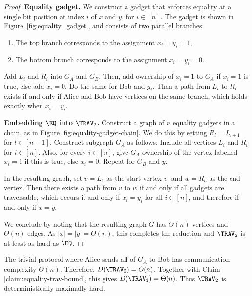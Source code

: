 \begin{proof}
\textbf{Equality gadget.}
We construct a gadget that enforces equality at a single bit position at index $i$ of $x$ and $y$, for $i \in [n]$. The gadget is shown in Figure~\ref{fig:equality_gadget}, and consists of two parallel branches:

\begin{enumerate}
    \item The top branch corresponds to the assignment $x_i = y_i = 1$, 
    \item The bottom branch corresponds to the assignment $x_i = y_i = 0$. 
\end{enumerate}
 


Add $L_i$ and $R_i$ into $G_A$ and $G_B$. Then, add ownership of $x_i = 1$ to $G_A$ if $x_i = 1$ is true, else add $x_i = 0$. Do the same for Bob and $y_i$. Then a path from $L_i$ to $R_i$ exists if and only if Alice and Bob have vertices on the same branch, which holds exactly when $x_i = y_i$.

\textbf{Embedding $\EQ$ into $\TRAV_2$.}
Construct a graph of $n$ equality gadgets in a chain, as in Figure \ref{fig:equality-gadget-chain}. We do this by setting $R_{l} = L_{l+1}$ for $l \in [n-1]$. Construct subgraph $G_A$ as follows: Include all vertices $L_i$ and $R_i$ for $i \in [n]$. Also, for every $i \in [n]$, give $G_A$ ownership of the vertex labelled $x_i = 1$ if this is true, else $x_i = 0$. Repeat for $G_B$ and $y$.

In the resulting graph, set $v = L_1$ as the start vertex $v$, and $w = R_n$ as the end vertex. Then there exists a path from $v$ to $w$ if and only if all gadgets are traversable, which occurs if and only if $x_i = y_i$ for all $i \in [n]$, and therefore if and only if $x = y$.



We conclude by noting that the resulting graph $G$ has $\Theta(n)$ vertices and $\Theta(n)$ edges. As $|x| = |y| = \Theta(n)$, this completes the reduction and $\TRAV_2$ is at least as hard as $\EQ$.
\end{proof}

The trivial protocol where Alice sends all of $G_A$ to Bob has communication complexity $\Theta(n)$. Therefore, $D(\TRAV_2) = O(n)$. Together with Claim \ref{claim:equality-trav-bound}, this gives $D(\TRAV_2) = \Theta(n)$. Thus $\TRAV_2$ is deterministically maximally hard.

